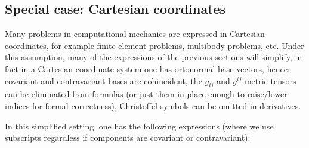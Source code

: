 \documentclass{digitaldynamics}
\begin{document}
\subsection{Special case: Cartesian coordinates}

Many problems in computational mechanics are expressed in Cartesian coordinates, for example finite element problems, multibody problems, etc. Under this assumption, many of the
expressions of the previous sections will simplify, in fact in a Cartesian coordinate system one has ortonormal base vectors, hence: 
covariant and contravariant bases are cohincident,
the $g_{ij}$ and $g^{ij}$ metric tensors can be eliminated from formulas (or just them in place enough to raise/lower indices for formal correctness), Christoffel symbols can be omitted in
derivatives. 

In this simplified setting, one has the following expressions (where we use subscripts regardless if components are covariant or contravariant):
\end{document}
